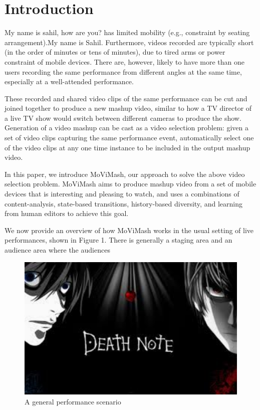 \documentclass{sig-alternate-05-2015}
\begin{document}
\section{Introduction}
My name is sahil, how are you?
has limited mobility (e.g., constraint by seating arrangement).My name is Sahil. Furthermore,
videos recorded are typically short (in the order of minutes
or tens of minutes), due to tired arms or power constraint of mobile
devices. There are, however, likely to have more than one users
recording the same performance from different angles at the same
time, especially at a well-attended performance.\par
These recorded and shared video clips of the same performance
can be cut and joined together to produce a new mashup video,
similar to how a TV director of a live TV show would switch between
different cameras to produce the show. Generation of a video
mashup can be cast as a video selection problem: given a set of
video clips capturing the same performance event, automatically
select one of the video clips at any one time instance to be included
in the output mashup video.\par
In this paper, we introduce MoViMash, our approach to solve
the above video selection problem. MoViMash aims to produce
mashup video from a set of mobile devices that is interesting and
pleasing to watch, and uses a combinations of content-analysis,
state-based transitions, history-based diversity, and learning from
human editors to achieve this goal.\par
We now provide an overview of how MoViMash works in the
usual setting of live performances, shown in Figure 1. There is
generally a staging area and an audience area where the audiences
\begin{figure}
\centering
\includegraphics{note.pdf}
\caption{A general performance scenario}
\end{figure}
\end{document}
